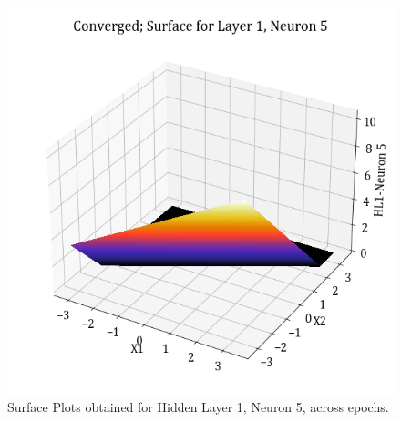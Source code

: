 \documentclass[11pt,a4paper]{article}
\begin{document}
\begin{figure}[H]
    \includegraphics[scale=0.4]{images/1B_MLFFNN_conv_HL1_N5.png}
    \caption{Surface Plots obtained for Hidden Layer 1, Neuron 5, across epochs.}
\end{figure}
\end{document}
